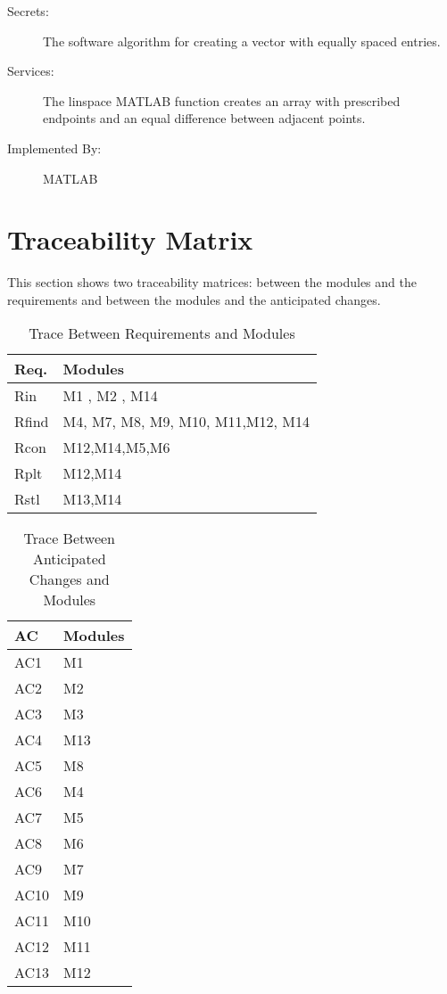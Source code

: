 \documentclass[12pt, titlepage]{article}
\begin{document}
	\begin{description}
		\item[Secrets:] The software algorithm for creating a vector with 
		equally 
		spaced entries. 
		\item[Services:] The linspace MATLAB function creates an array with
		prescribed endpoints and an equal difference between adjacent
		points. 
		\item[Implemented By:] MATLAB
	\end{description} 
	
	\section{Traceability Matrix} \label{SecTM}
	
	This section shows two traceability matrices: between the modules and the
	requirements and between the modules and the anticipated changes.
	
	\begin{table}[H]
		\centering
		\begin{tabular}{p{} p{}}
			\toprule
			\textbf{Req.} & \textbf{Modules}\\
			\midrule
			Rin & M1 , M2 , M14\\
			Rfind & M4, M7, M8, M9, M10, M11,M12, M14\\
			Rcon & M12,M14,M5,M6\\
			Rplt & M12,M14 \\
			Rstl & M13,M14\\
			\bottomrule
		\end{tabular}
		\caption{Trace Between Requirements and Modules}
		\label{TblRT}
	\end{table}
	
	\begin{table}[H]
		\centering
		\begin{tabular}{p{} p{}}
			\toprule
			\textbf{AC} & \textbf{Modules}\\
			\midrule
			AC1 & M1\\
			AC2 & M2\\
			AC3 & M3\\
			AC4 & M13\\
			AC5 & M8\\ 
			AC6 & M4\\ 
			AC7 & M5\\ 
			AC8 & M6\\ 
			AC9 & M7\\ 
			AC10 & M9\\ 
			AC11 & M10\\
			AC12 & M11\\ 
			AC13 & M12\\
			\bottomrule
		\end{tabular}
		\caption{Trace Between Anticipated Changes and Modules}
		\label{TblACT}
	\end{table}
	
\end{document}
